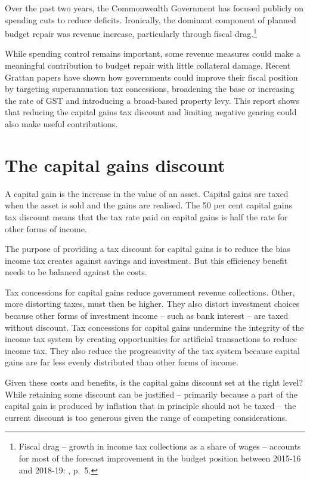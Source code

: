 \documentclass{grattanAlpha}\usepackage[]{graphicx}\usepackage[]{color}
\begin{document}
Over the past two years, the Commonwealth Government has focused publicly on spending cuts to reduce deficits. Ironically, the dominant component of planned budget repair was revenue increase, particularly through fiscal drag.\footnote{Fiscal drag – growth in income tax collections as a share of wages – accounts for most of the forecast improvement in the budget position between 2015-16 and 2018-19: \textcite{DaleyWood2015FiscalChallenges}, p.~5.}
 
While spending control remains important, some revenue measures could make a meaningful contribution to budget repair with little collateral damage. Recent Grattan papers have shown how governments could improve their fiscal position by targeting superannuation tax concessions, broadening the base or increasing the rate of GST and introducing a broad-based property levy. This report shows that reducing the capital gains tax discount and limiting negative gearing could also make useful contributions.

\flushcolsend

\chapter{The capital gains discount}\label{chapter:The-capital-gains-discount}
A capital gain is the increase in the value of an asset. Capital gains are taxed when the asset is sold and the gains are realised. The 50 per cent capital gains tax discount means that the tax rate paid on capital gains is half the rate for other forms of income. 

The purpose of providing a tax discount for capital gains is to reduce the bias income tax creates against savings and investment. But this efficiency benefit needs to be balanced against the costs. 

Tax concessions for capital gains reduce government revenue collections. Other, more distorting taxes, must then be higher. They also distort investment choices because other forms of investment income – such as bank interest – are taxed without discount. Tax concessions for capital gains undermine the integrity of the income tax system by creating opportunities for artificial transactions to reduce income tax. They also reduce the progressivity of the tax system because capital gains are far less evenly distributed than other forms of income. 

Given these costs and benefits, is the capital gains discount set at the right level? While retaining some discount can be justified – primarily because a part of the capital gain is produced by inflation that in principle should not be taxed – the current discount is too generous given the range of competing considerations.
\end{document}
